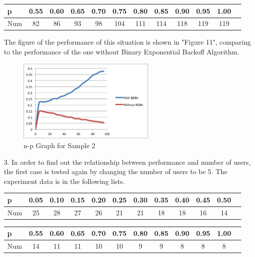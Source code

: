 \documentclass[11pt,a4paper]{report}
\begin{document}
\begin{table}[htbp]
\begin{tabular}{lccccccccccc}
\toprule
p & 0.55 & 0.60 & 0.65  & 0.70 & 0.75 & 0.80 & 0.85 & 0.90 & 0.95 & 1.00 \\
\midrule
Num & 82 & 86 & 93 & 98 & 104 & 111 & 114 & 118 & 119 & 119 \\
\bottomrule
\end{tabular}
\end{table}

The figure of the performance of this situation is shown in "Figure 11", comparing to the performance of the one without Binary Exponential Backoff Algorithm. \\
\begin{figure}
\centering
\includegraphics[width=0.6\textwidth]{4_3.eps}
\caption{n-p Graph for Sample 2}
\end{figure}

3. In order to find out the relationship between performance and number of users, the first case is tested again by changing the number of users to be 5. The experiment data is in the following lists. \\
\begin{table}[htbp]
\begin{tabular}{lccccccccccc}
\toprule
p & 0.05 & 0.10 & 0.15  & 0.20 & 0.25 & 0.30 & 0.35 & 0.40 & 0.45 & 0.50 \\
\midrule
Num & 25 & 28 & 27 & 26 & 21 & 21 & 18 & 18 & 16 & 14 \\
\bottomrule
\end{tabular}
\end{table}

\begin{table}[htbp]
\begin{tabular}{lccccccccccc}
\toprule
p & 0.55 & 0.60 & 0.65  & 0.70 & 0.75 & 0.80 & 0.85 & 0.90 & 0.95 & 1.00 \\
\midrule
Num & 14 & 11 & 11 & 10 & 10 & 9 & 9 & 8 & 8 & 8 \\
\bottomrule
\end{tabular}
\end{table}
\end{document}

